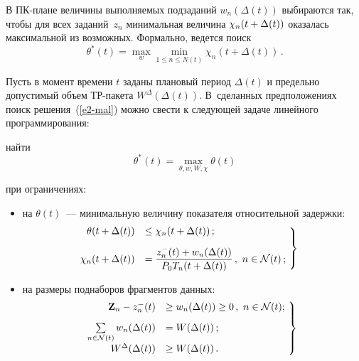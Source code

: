 \begin{multicols}{2}
В ПК-плане величины выполняемых подзаданий $w_{n}(\Delta(t))$
выбираются так, чтобы  для всех заданий~$z_{n}$ минимальная величина
$\chi_n(t \hm+ \Delta(t))$ оказалась максимальной из возможных.
Формально,  ведется поиск
\begin{equation}
\theta^*(t) = \max_{w}  \min\limits_{1 \le n \le N (t)}  
\chi_n (t + \Delta(t))\,. \label{e2-mal}
\end{equation}

Пусть в момент времени $t$ заданы плановый период $\Delta(t)$ и
предельно допустимый объем ТР-па\-ке\-та $W^{\Delta}(\Delta (t))$. 
В~сделанных предположениях поиск решения~(\ref{e2-mal}) можно свести к следующей
задаче линейного программирования:

найти
\begin{equation}
 \theta^*(t) = \max_{\theta,  w,  W, \chi} \theta(t) 
 \label{e3-mal}
 \end{equation}

при ограничениях:
\begin{itemize}
\item на $\theta(t)$~--- минимальную величину показателя относительной задержки:
\begin{equation}
\hspace*{-7mm}\left.
\begin{array}{rl}
  \theta(t + \Delta(t)) & \le \chi_n(t + \Delta(t))\,; \\[9pt]
\chi_n(t + \Delta(t)) &= \displaystyle\fr{z^-_{n}(t) + w_{n}(\Delta(t))}
{P_0 T_n(t + \Delta(t))}\,, \ n \in \mathcal{N}(t)\,; 
                    \end{array}
                    \!\right \} \!\!\!
                    \label{e4-mal}
                    \end{equation}
\item
на размеры поднаборов фрагментов данных:
\begin{equation}
\hspace*{-4mm}\left.  \begin{array}{rl}
  \textbf{Z}_{n} - z^-_n(t) &\ge  w_n(\Delta (t)) \ge 0\,,\ n \in \mathcal{N}(t);\\[9pt]
 \sum\limits_{n \in \mathcal{N}(t)} w_n(\Delta (t)) &=  W (\Delta (t))\,; \\[9pt]
W^{\Delta} (\Delta (t)) &\ge  W (\Delta (t))\,. 
                    \end{array}\!
                    \right \} \!\!
                    \label{e5-mal}
                    \end{equation}
                    \end{itemize}


\end{multicols}
